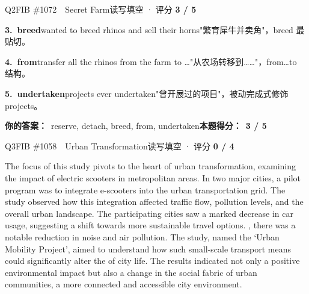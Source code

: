\begin{qblock}{Q2\quad FIB \#1072\ \ Secret Farm}{读写填空 · 评分 \textcolor{cAccent}{\bfseries 3 / 5}}
\begin{notebox}
\textbf{3.\ breed}\quad wanted to breed rhinos and sell their horns"繁育犀牛并卖角"，breed 最贴切。\par\smallskip
\textbf{4.\ from}\quad transfer all the rhinos from the farm to \dots"从农场转移到……"，from\dots to 结构。\par\smallskip
\textbf{5.\ undertaken}\quad projects ever undertaken"曾开展过的项目"，被动完成式修饰 projects。
\end{notebox}
\smallskip
\textbf{你的答案：}\ {\color{cWrong}reserve}, {\color{cWrong}detach}, breed, from, undertaken\qquad\textbf{本题得分：}\ {\color{cAccent}\bfseries 3 / 5}
\end{qblock}

\begin{qblock}{Q3\quad FIB \#1058\ \ Urban Transformation}{读写填空 · 评分 \textcolor{cAccent}{\bfseries 0 / 4}}
\begin{promptbox}
The focus of this study pivots to the heart of urban transformation, examining the impact of electric scooters in metropolitan areas. In two major cities, a pilot program was  to integrate e-scooters into the urban transportation grid. The study observed how this integration affected traffic flow, pollution levels, and the overall urban landscape. The participating cities saw a marked decrease in car usage, suggesting a shift towards more sustainable travel options. , there was a notable reduction in noise and air pollution. The study, named the `Urban Mobility Project', aimed to understand how such small-scale transport means could significantly alter the  of city life. The results indicated not only a positive environmental impact but also a change in the social fabric of urban communities,  a more connected and accessible city environment.
\end{promptbox}

\end{qblock}

